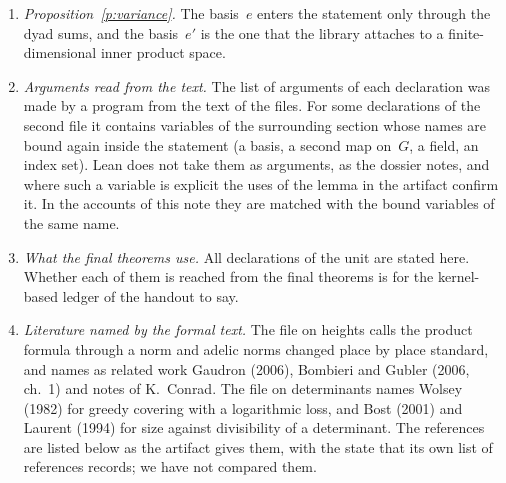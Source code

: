 \documentclass[11pt,a4paper]{article}
\theoremstyle{plainx}
\theoremstyle{uprightx}
\begin{document}
\begin{enumerate}[label=\textup{\arabic*.},leftmargin=1.6em,itemsep=5pt]
\item \emph{Proposition~\ref{p:variance}.} The basis~$e$ enters the statement only through the dyad sums, and the
basis~$e'$ is the one that the library attaches to a finite-dimensional inner product space.
\item \emph{Arguments read from the text.} The list of arguments of each declaration was made by a program from
the text of the files. For some declarations of the second file it contains variables of the surrounding
section whose names are bound again inside the statement (a basis, a second map on~$G$, a field, an index set).
Lean does not take them as arguments, as the dossier notes, and where such a variable is explicit the uses of the
lemma in the artifact confirm it. In the accounts of this note they are matched with the bound variables of the
same name.
\item \emph{What the final theorems use.} All declarations of the unit are stated here. Whether each of them is
reached from the final theorems is for the kernel-based ledger of the handout to say.
\item \emph{Literature named by the formal text.} The file on heights calls the product formula through a norm
and adelic norms changed place by place standard, and names as related work Gaudron (2006), Bombieri and Gubler
(2006, ch.~1) and notes of K.~Conrad. The file on determinants names Wolsey (1982) for greedy covering with a
logarithmic loss, and Bost (2001) and Laurent (1994) for size against divisibility of a determinant. The
references are listed below as the artifact gives them, with the state that its own list of references records;
we have not compared them.
\end{enumerate}
\end{document}
